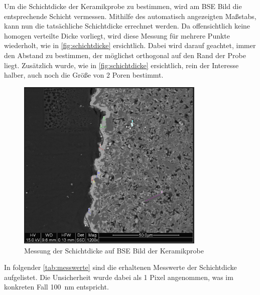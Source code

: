 \documentclass[12pt,english,ngerman]{scrartcl}
\begin{document}
Um die Schichtdicke der Keramikprobe zu bestimmen, wird am BSE Bild die entsprechende Schicht vermessen. Mithilfe des automatisch
angezeigten Maßstabs, kann nun die tatsächliche Schichtdicke errechnet werden. Da offensichtlich keine homogen verteilte
Dicke vorliegt, wird diese Messung für mehrere Punkte wiederholt, wie in \autoref{fig:schichtdicke} ersichtlich. Dabei wird 
darauf geachtet, immer den Abstand zu bestimmen, der möglichst orthogonal auf den Rand der Probe liegt. Zusätzlich wurde,
wie in \autoref{fig:schichtdicke} ersichtlich, rein der Interesse halber, auch noch die Größe von 2 Poren bestimmt.

\begin{figure}[H]
	\begin{center}
		\includegraphics[width =0.8\textwidth]{./figures/schichtdicke.png}
	\end{center}
	\caption{Messung der Schichtdicke auf BSE Bild der Keramikprobe}
    \label{fig:schichtdicke}
\end{figure}

In folgender \autoref{tab:messwerte} sind die erhaltenen Messwerte der Schichtdicke aufgelistet. Die Unsicherheit wurde dabei 
als 1 Pixel angenommen, was im konkreten Fall \SI{100}{\nano\m} entspricht.
\end{document}
